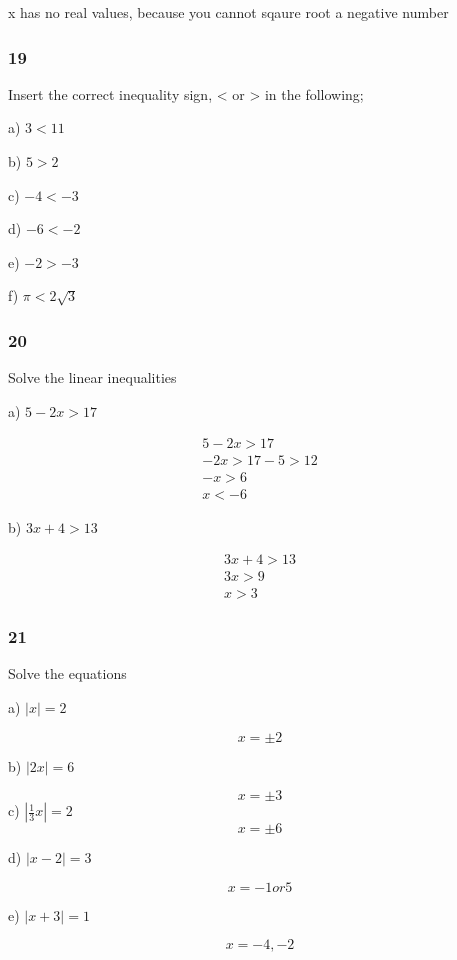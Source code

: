 \documentclass[]{report}
\begin{document}
x has no real values, because you cannot sqaure root a negative number

\subsubsection{19}

Insert the correct inequality sign, < or > in the following;

a) $ 3 < 11$

b) $5 > 2$

c) $-4 < -3 $

d) $-6 < -2$

e) $-2 > -3$

f) $\pi < 2\sqrt{3}$

\subsubsection{20}

Solve the linear inequalities

a) $ 5-2x > 17 $

\begin{align*}
5-2x > 17  \\
-2x > 17 - 5 > 12 \tag*{taking 5 off}\\
-x > 6 \tag*{dividing by 2}\\
x < -6 \tag*{multiplying by -1}
\end{align*}

b) $ 3x + 4 > 13$

\begin{align*}
3x + 4 > 13 \\
3x > 9 \tag*{taking 4 off}\\
x > 3 \tag*{dividing by 3}
\end{align*}

\subsubsection{21}

Solve the equations

a) $|x| = 2 $

\[
x = \pm 2
\]

b) $|2x| = 6$

\[
x = \pm 3
\]
c) $|\frac{1}{3}x| = 2 $
\[
x = \pm 6
\]

d) $|x-2| = 3 $

\[
x = -1 or 5
\]

e) $|x + 3 | = 1$

\[
x = -4, -2
\]
\end{document}
